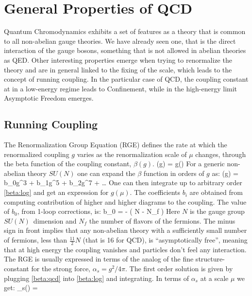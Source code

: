 \section{General Properties of QCD}
Quantum Chromodynamics exhibits a set of features as a theory that is common to all non-abelian gauge theories. We have already seen one, that is the direct interaction of the gauge bosons, something that is not allowed in abelian theories as QED. Other interesting properties emerge when trying to renormalize the theory and are in general linked to the fixing of the scale, which leads to the concept of running coupling. In the particular case of QCD, the coupling constant at in a low-energy regime leads to Confinement, while in the high-energy limit Asymptotic Freedom emerges. 

\subsection{Running Coupling} 
\label{sec:running_coupling}
The Renormalization Group Equation (RGE) defines the rate at which the renormalized coupling $g$ varies as the renormalization scale of  $\mu$ changes, through the beta function of the coupling constant, $\beta(g)$.
\beq
    \beta(g) = g(\mu) 
    \label{beta:log}
\eeq 
For a generic non-abelian theory $SU(N)$ one can expand the $\beta$ function in orders of $g$ as:
\beq
    \beta(g) = b_0g^3 + b_1g^5 + b_2g^7 + \dots   
\eeq
One can then integrate up to arbitrary order \cref{beta:log} and get an expression for $g(\mu)$. The coefficients $b_i$ are obtained from computing contribution of higher and higher diagrams to the coupling. The value of $b_0$, from 1-loop corrections, is:
\beq 
    b_0 = -  \left( N - N_f \right)
    \label{beta:qcd}
\eeq
Here $N$ is the gauge group $SU(N)$ dimension and $N_f$ the number of flavors of the fermions. The minus sign in front implies that any non-abelian theory with a sufficiently small number of fermions, less than $\frac{11}{2}N$ (that is 16 for QCD),  is ``asymptotically free'', meaning that at high energy the coupling vanishes and particles don't feel any interaction.\\
The RGE is usually expressed in terms of the analog of the fine structure-constant for the strong force, $\alpha_s = g^2/4\pi$. The first order solution is given by plugging \cref{beta:qcd} into \cref{beta:log} and integrating. In terms of $\alpha_s$ at a scale $\mu$ we get: 
\beq
    \alpha_s(\mu) = 

